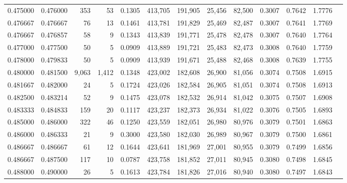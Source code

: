 \begin{tabular}{rrrrrrrrrrrrr}
0.475000 & 0.476000 &    353 &    53 &                                     0.1305 & 413,705 & 191,905 &  25,456 &  82,500 & 0.3007 & 0.7642 & 1.7776 \\
0.476667 & 0.476667 &     76 &    13 &                                     0.1461 & 413,781 & 191,829 &  25,469 &  82,487 & 0.3007 & 0.7641 & 1.7769 \\
0.476667 & 0.476857 &     58 &     9 &                                     0.1343 & 413,839 & 191,771 &  25,478 &  82,478 & 0.3007 & 0.7640 & 1.7764 \\
0.477000 & 0.477500 &     50 &     5 &                                     0.0909 & 413,889 & 191,721 &  25,483 &  82,473 & 0.3008 & 0.7640 & 1.7759 \\
0.478000 & 0.479833 &     50 &     5 &                                     0.0909 & 413,939 & 191,671 &  25,488 &  82,468 & 0.3008 & 0.7639 & 1.7755 \\
0.480000 & 0.481500 &  9,063 & 1,412 &                                     0.1348 & 423,002 & 182,608 &  26,900 &  81,056 & 0.3074 & 0.7508 & 1.6915 \\
0.481667 & 0.482000 &     24 &     5 &                                     0.1724 & 423,026 & 182,584 &  26,905 &  81,051 & 0.3074 & 0.7508 & 1.6913 \\
0.482500 & 0.483214 &     52 &     9 &                                     0.1475 & 423,078 & 182,532 &  26,914 &  81,042 & 0.3075 & 0.7507 & 1.6908 \\
0.483333 & 0.484833 &    159 &    20 &                                     0.1117 & 423,237 & 182,373 &  26,934 &  81,022 & 0.3076 & 0.7505 & 1.6893 \\
0.485000 & 0.486000 &    322 &    46 &                                     0.1250 & 423,559 & 182,051 &  26,980 &  80,976 & 0.3079 & 0.7501 & 1.6863 \\
0.486000 & 0.486333 &     21 &     9 &                                     0.3000 & 423,580 & 182,030 &  26,989 &  80,967 & 0.3079 & 0.7500 & 1.6861 \\
0.486667 & 0.486667 &     61 &    12 &                                     0.1644 & 423,641 & 181,969 &  27,001 &  80,955 & 0.3079 & 0.7499 & 1.6856 \\
0.486667 & 0.487500 &    117 &    10 &                                     0.0787 & 423,758 & 181,852 &  27,011 &  80,945 & 0.3080 & 0.7498 & 1.6845 \\
0.488000 & 0.490000 &     26 &     5 &                                     0.1613 & 423,784 & 181,826 &  27,016 &  80,940 & 0.3080 & 0.7497 & 1.6843 \\

\end{tabular}
